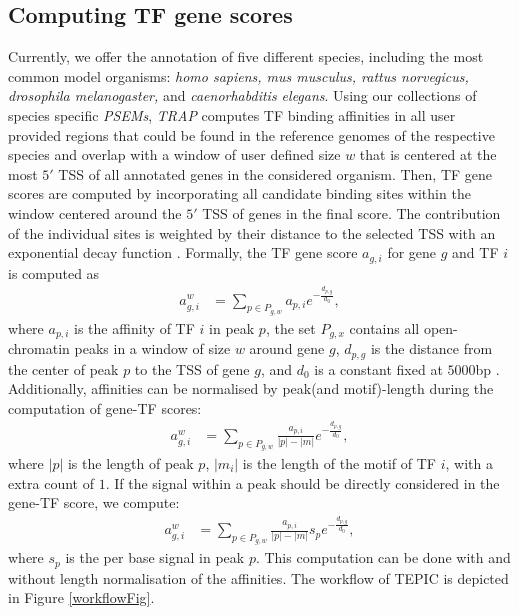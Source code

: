 \documentclass{article}
\begin{document}
\subsection*{Computing TF gene scores}
Currently, we offer the annotation of five different species, including the most common model organisms: 
\textit{homo sapiens, mus musculus, rattus norvegicus, drosophila melanogaster,} and \textit{caenorhabditis elegans}.
Using our collections of species specific \textit{PSEMs}, \textit{TRAP} computes TF binding affinities in all user provided regions 
that could be found in the reference genomes of the respective species and 
overlap with a window of user defined size $w$ that is centered at the most $5'$ TSS of all annotated genes in the considered organism. 
Then, TF gene scores are computed by incorporating all candidate binding sites within the window centered around the $5'$ TSS of genes in the final score. 
The contribution of the individual sites is weighted by their distance to the selected TSS with an exponential decay function \cite{pmid19995984}.
Formally, the TF gene score $a_{g,i}$ for gene $g$ and TF $i$ is computed as
\begin{align}
a_{g,i}^{w}&=\sum_{p \in P_{g,w}} a_{p,i}e^{-\frac{d_{p,g}}{d_0}},
\end{align}
where $a_{p,i}$ is the affinity of TF $i$ in peak $p$, the set $P_{g,x}$ contains all open-chromatin peaks
in a window of size $w$ around gene $g$, $d_{p,g}$ is the distance from the center of peak $p$ to the TSS of gene $g$, and $d_0$ is a constant fixed at $5000$bp \cite{pmid19995984}.
Additionally, affinities can be normalised by peak(and motif)-length during the computation of gene-TF scores:
\begin{align}
a_{g,i}^{w}&=\sum_{p \in P_{g,w}} {\frac{a_{p,i}}{|p|-|m|}e^{-\frac{d_{p,g}}{d_0}}},
\end{align}
where $|p|$ is the length of peak $p$, $|m_i|$ is
the length of the motif of TF $i$, with a extra count of $1$.
If the signal within a peak should be directly considered in the gene-TF score, we compute:
\begin{align}
a_{g,i}^{w}&=\sum_{p \in P_{g,w}} {\frac{a_{p,i}}{|p|-|m|}s_{p}e^{-\frac{d_{p,g}}{d_0}}},
\end{align}
where $s_p$ is the per base signal in peak $p$. This computation can be done with and without length normalisation of the affinities. 
The workflow of TEPIC is depicted in Figure \ref{workflowFig}.
\end{document}
